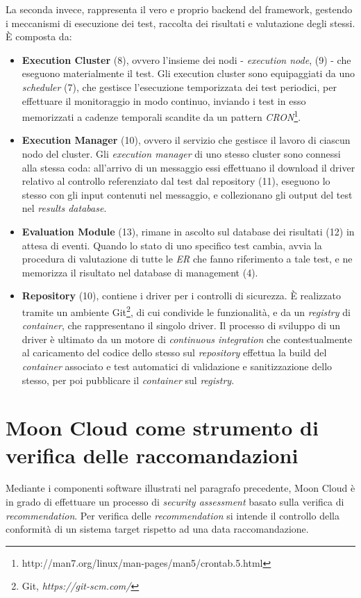\documentclass[../main.tex]{subfiles}
\begin{document}
La seconda invece, rappresenta il vero e proprio backend del framework, gestendo i meccanismi di esecuzione dei test, raccolta dei risultati e valutazione degli stessi.
È composta da:
\begin{itemize}
    \item \textbf{Execution Cluster} (8), ovvero l'insieme dei nodi - \textit{execution node}, (9)  - che eseguono materialmente il test. Gli execution cluster sono equipaggiati da uno \textit{scheduler} (7), che gestisce l'esecuzione temporizzata dei test periodici, per effettuare il monitoraggio in modo continuo, inviando i test in esso memorizzati a cadenze temporali scandite da un pattern \textit{CRON}\footnote{http://man7.org/linux/man-pages/man5/crontab.5.html}.
    \item \textbf{Execution Manager} (10), ovvero il servizio che gestisce il lavoro di ciascun nodo del cluster.        
        Gli \textit{execution manager} di uno stesso cluster sono connessi alla stessa coda: all'arrivo di un messaggio essi effettuano il download il driver relativo al controllo referenziato dal test dal repository (11), eseguono lo stesso con gli input contenuti nel messaggio, e collezionano gli output del test nel \textit{results database}. 
    \item \textbf{Evaluation Module} (13), rimane in ascolto sul database dei risultati (12) in attesa di eventi. Quando lo stato di uno specifico test cambia, avvia la procedura di valutazione di tutte le \textit{ER} che fanno riferimento a tale test, e ne memorizza il risultato nel database di management (4).
    \item \textbf{Repository} (10), contiene i driver per i controlli di sicurezza. È realizzato tramite un ambiente Git\footnote{Git, \textit{https://git-scm.com/}}, di cui condivide le funzionalità, e da un \textit{registry} di \textit{container}, che rappresentano il singolo driver. Il processo di sviluppo di un driver è ultimato da un motore di \textit{continuous integration} che contestualmente al caricamento del codice dello stesso sul \textit{repository} effettua la build del \textit{container} associato e test automatici di validazione e sanitizzazione dello stesso, per poi pubblicare il \textit{container} sul \textit{registry}.
\end{itemize}
\section{Moon Cloud come strumento di verifica delle raccomandazioni}
Mediante i componenti software illustrati nel paragrafo precedente, Moon Cloud è in grado di effettuare un processo di \textit{security assessment} basato sulla verifica di \textit{recommendation}.
Per verifica delle \textit{recommendation} si intende il controllo  della conformità di un sistema target rispetto ad una data raccomandazione.
\end{document}
